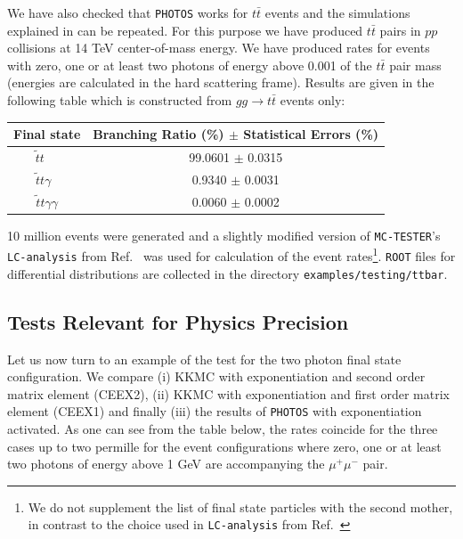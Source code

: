 \documentclass[]{Photos_interface_design}
\begin{document}
We have also checked that {\tt PHOTOS} works for $t \bar t$ events and the simulations explained in \cite{RichterWas:1993ta} can be repeated.
For this purpose we have produced $t \bar t$ pairs in $pp$ collisions at 
14 TeV center-of-mass energy. We have produced rates for events with zero, one or
at least two photons of energy above 0.001 of the $t \bar t$ pair mass
(energies are calculated in  the hard scattering frame).
Results are given in the following table which is constructed from  
$gg \to t \bar t$ events only:


\vspace{0.3cm} 
\begin{center}
{ \begin{tabular}{c c} 
\toprule 
Final state &  Branching Ratio (\%) $\pm$ Statistical Errors (\%) \\  
\midrule
{$ \widetilde{t} t \; \;\; \;$}  &  {99.0601 $\pm$ 0.0315}  \\ 
 {$  \widetilde{t} t \gamma \;\;$} &   { 0.9340 $\pm$  0.0031}   \\ 
{$  \widetilde{t} t \gamma \gamma$}  &  { 0.0060 $\pm$  0.0002}  \\ 
\bottomrule
\end{tabular} 
}  
\end{center} 

10 million events were generated and a slightly modified 
version of {\tt MC-TESTER}'s {\tt LC-analysis} from Ref.~\cite{Golonka:2002rz}
was used for calculation of the event rates\footnote{  We do not supplement the list of 
final state particles with the second mother, in contrast to the choice used in {\tt LC-analysis} from  Ref.~\cite{Golonka:2002rz} }.
{\tt ROOT} files for differential distributions are 
collected in the directory {\tt examples/testing/ttbar}. 

\subsection{Tests Relevant for Physics Precision}


Let us now turn to an example of the test for the two photon final state configuration.
We compare (i) KKMC \cite{kkcpc:1999} with exponentiation and second order matrix element (CEEX2), (ii) KKMC with exponentiation and first order matrix element (CEEX1)
and finally (iii) the results of {\tt PHOTOS} with exponentiation activated. As one can see from the table below, the rates 
coincide for the three cases up to two permille for the event configurations 
where zero, one or at least two photons of energy above 1 GeV are accompanying the $\mu^+\mu^-$ pair.
\end{document}
